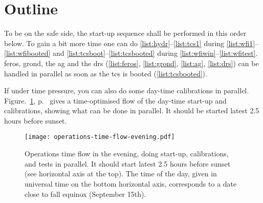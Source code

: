 \documentclass[11pt,fleqn]{book}
\def\figureref#1{Figure.~\ref{fig:#1}, p.~\pageref{fig:#1}}
\begin{document}
\section{Outline}

To be on the safe side, the start-up sequence shall be performed in this order below. To gain a bit more time one can do \ref{list:hydr}--\ref{list:tcs1} during \ref{list:wfi1}--\ref{list:wfibooted} and
\ref{list:tcsboot}--\ref{list:tcsbooted} during
\ref{list:wfiwin}--\ref{list:wfitest}.  \gls{feros}, \gls{grond}, the \gls{ag} and the \gls{drs} (\ref{list:feros}, \ref{list:grond}, \ref{list:ag}, \ref{list:drs}) can be handled in parallel as soon as the \gls{tcs} is booted
(\ref{list:tcsbooted}).  

If under time pressure, you can also do some day-time calibrations in parallel. \figureref{timeflow-eve} gives a time-optimised flow of the day-time start-up and calibrations, showing what can be done in parallel.  It should be started latest 2.5 hours before sunset.
\begin{figure}
\texttt{[image: operations-time-flow-evening.pdf]}
\caption{Operations time flow in the evening, doing start-up, calibrations, and tests in parallel.  It should start latest 2.5 hours before sunset (see horizontal axis at the top).  The time of the day, given in universal time on the bottom horizontal axis, corresponds to a date close to fall equinox (September 15th).}
\label{fig:timeflow-eve}
\end{figure}
\end{document}
